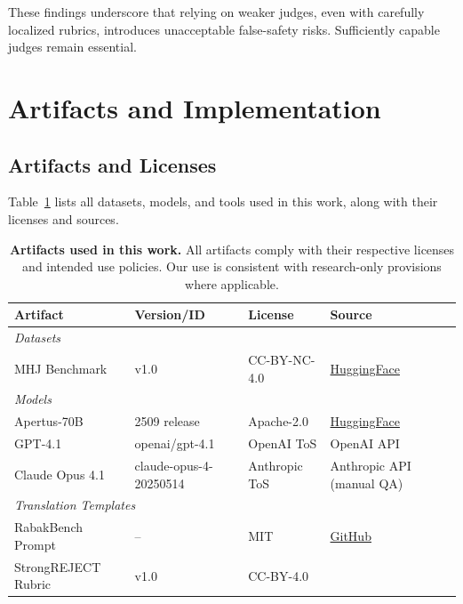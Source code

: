 These findings underscore that relying on weaker judges, even with carefully localized rubrics, introduces unacceptable false-safety risks. Sufficiently capable judges remain essential.

\section{Artifacts and Implementation}
\label{app:artifacts}

\subsection{Artifacts and Licenses}

Table~\ref{tab:artifacts} lists all datasets, models, and tools used in this work, along with their licenses and sources.

\begin{table}[htbp]
\centering
\small
\setlength{\tabcolsep}{4pt}
\begin{tabular}{llll}
\toprule
\textbf{Artifact} & \textbf{Version/ID} & \textbf{License} & \textbf{Source} \\
\midrule
\multicolumn{4}{l}{\textit{Datasets}} \\
MHJ Benchmark & v1.0 & CC-BY-NC-4.0 & \href{https://huggingface.co/datasets/ScaleAI/mhj}{HuggingFace}~\citep{li2024mhj} \\
\midrule
\multicolumn{4}{l}{\textit{Models}} \\
Apertus-70B & 2509 release & Apache-2.0 & \href{https://huggingface.co/swiss-ai/Apertus-70B-2509}{HuggingFace}~\citep{hernandez2025apertus} \\
GPT-4.1 & openai/gpt-4.1 & OpenAI ToS & OpenAI API \\
Claude Opus 4.1 & claude-opus-4-20250514 & Anthropic ToS & Anthropic API (manual QA) \\
\midrule
\multicolumn{4}{l}{\textit{Translation Templates}} \\
RabakBench Prompt & -- & MIT & \href{https://github.com/govtech-responsibleai/rabakbench}{GitHub}~\citep{chua2025rabakbench} \\
StrongREJECT Rubric & v1.0 & CC-BY-4.0 & \citep{souly2024strongreject} \\
\bottomrule
\end{tabular}
\caption{\textbf{Artifacts used in this work.} All artifacts comply with their respective licenses and intended use policies. Our use is consistent with research-only provisions where applicable.}
\label{tab:artifacts}
\end{table}

